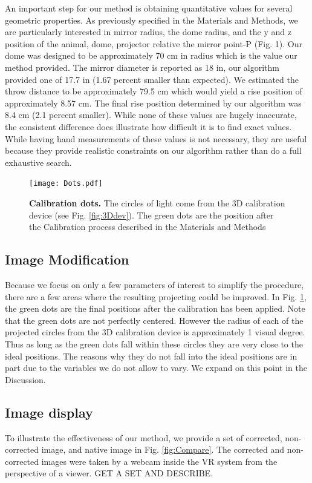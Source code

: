\documentclass[10pt,letterpaper]{article}
\begin{document}
An important step for our method is obtaining quantitative values for several geometric properties. As previously specified in the Materials and Methods, we are particularly 
interested in mirror radius, the dome radius, and the y and z position of the animal, dome, projector relative the mirror point-P (Fig. 1). Our dome was designed to be 
approximately 70 cm in radius which is the value our method provided. The mirror diameter is reported as 18 in, our algorithm provided one of 17.7 in (1.67 percent smaller 
than expected). We estimated the throw distance to be approximately 79.5 cm which would yield a rise position of approximately 8.57 cm. The final rise position determined 
by our algorithm was 8.4 cm (2.1 percent smaller). While none of these values are hugely inaccurate, the consistent difference does illustrate how difficult it is to find exact 
values. While having hand measurements of these values is not necessary, they are useful because they provide realistic constraints on our algorithm rather than do a full 
exhaustive search. 
\begin{figure}[h]
\centering
\texttt{[image: Dots.pdf]}
\caption{{\bf Calibration dots.}
The circles of light come from the 3D calibration device (see Fig. \ref{fig:3Ddev}). The green dots are the position after the Calibration process described in the Materials and Methods}
\label{fig:Dots}
\end{figure}
\subsection*{Image Modification}
Because we focus on only a few parameters of interest to simplify the procedure, there are a few areas where the resulting projecting could be improved. In Fig. \ref{fig:Dots}, the 
green dots are the final positions after the calibration has been applied. Note that the green dots are not perfectly centered. However the radius of each of the projected 
circles from the 3D calibration device is approximately 1 visual degree. Thus as long as the green dots fall within these circles they are very close to the ideal positions. The 
reasons why they do not fall into the ideal positions are in part due to the variables we do not allow to vary. We expand on this point in the Discussion.

\subsection*{Image display}

To illustrate the effectiveness of our method, we provide a set of corrected, non-corrected image, and native image in Fig. \ref{fig:Compare}. The corrected and non-corrected images 
were taken by a webcam inside the VR system from the perspective of a viewer. GET A SET AND DESCRIBE. 
\end{document}

